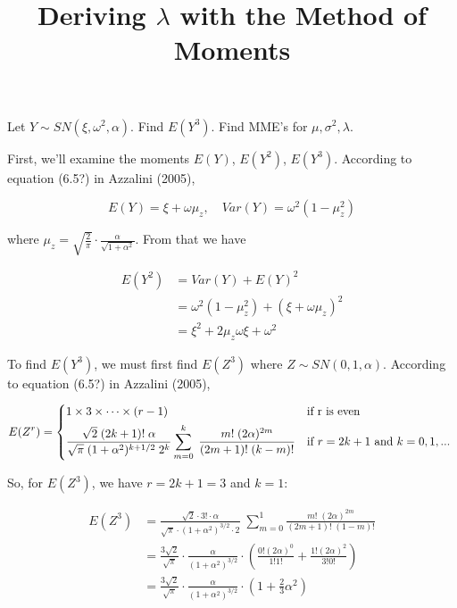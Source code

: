 \documentclass{article}
\begin{document}
\title {Deriving $\lambda$ with the Method of Moments}
\date{}
\maketitle

Let $Y \sim SN(\xi, \omega^2, \alpha)$. Find $E(Y^3)$. Find MME's for $\mu, \sigma^2, \lambda$.

First, we'll examine the moments $E(Y)$, $E(Y^2)$, $E(Y^3)$. According to equation (6.5?) in
Azzalini (2005),

\begin{equation}
  E(Y) = \xi + \omega \mu_z, \quad Var(Y) = \omega^2 (1 - \mu_z^2)
\end{equation}

where $\mu_z = \sqrt{\frac{2}{\pi}} \cdot \frac{\alpha}{\sqrt{1 + \alpha^2}}$. From that we have

\begin{align}
  E(Y^2) &= Var(Y) + E(Y)^2 \nonumber \\
  &= \omega^2 (1 - \mu_z^2) + (\xi + \omega \mu_z)^2 \nonumber \\
  &= \xi^2 + 2 \mu_z \omega \xi + \omega^2
\end{align}

To find $E(Y^3)$, we must first find $E(Z^3)$ where $Z \sim SN(0, 1, \alpha)$. According to equation
(6.5?) in Azzalini (2005),

\[
E(Z^r) =
 \begin{dcases*}
   1 \times 3 \times \cdots \times (r -1) & if r is even \\
   \frac{\sqrt{2}\;(2k + 1)!\;\alpha}{\sqrt{\pi}\;(1 + \alpha^2)^{k + 1/2}\;2^k}
   \sum_{m=0}^k\;\frac{m!\;(2\alpha)^{2m}}{(2m+1)!\;(k-m)!} & if $r = 2k+1$ and $k = 0, 1, ...$
\end{dcases*}
\]

So, for $E(Z^3)$, we have $r = 2k + 1 = 3$ and $k = 1$:

\begin{align}
  E(Z^3) &= \frac{\sqrt{2} \cdot 3! \cdot \alpha}{\sqrt{\pi} \cdot (1 + \alpha^2)^{3/2} \cdot 2} \;
  \sum_{m=0}^1 \frac{m!\;(2\alpha)^{2m}}{(2m + 1)!\;(1 - m)!} \nonumber \\
  &= \frac{3\sqrt{2}}{\sqrt{\pi}} \cdot \frac{\alpha}{(1 + \alpha^2)^{3/2}} \cdot \left( \frac{0!
      (2\alpha)^0}{1!1!} + \frac{1! (2\alpha)^2}{3!0!} \right) \nonumber \\
  &= \frac{3\sqrt{2}}{\sqrt{\pi}} \cdot \frac{\alpha}{(1 + \alpha^2)^{3/2}} \cdot \left( 1 +
    \frac{2}{3}\alpha^2 \right)
\end{align}
\end{document}
